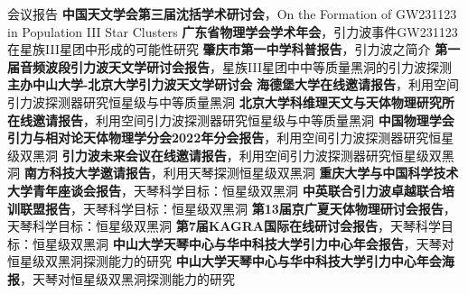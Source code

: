 
\begin{rubric}{会议报告}
	\entry*[2026] \textbf{中国天文学会第三届沈括学术研讨会}，On the Formation of GW231123 in Population III Star Clusters
	\entry*[2025] \textbf{广东省物理学会学术年会}，引力波事件GW231123在星族III星团中形成的可能性研究
	\entry*[2024] \textbf{肇庆市第一中学科普报告}，引力波之简介
	\entry*[2024] \textbf{第一届音频波段引力波天文学研讨会报告}，星族III星团中中等质量黑洞的引力波探测
	\entry*[2023] \textbf{主办中山大学-北京大学引力波天文学研讨会}
	\entry*[2023] \textbf{海德堡大学在线邀请报告}，利用空间引力波探测器研究恒星级与中等质量黑洞
	\entry*[2023] \textbf{北京大学科维理天文与天体物理研究所在线邀请报告}，利用空间引力波探测器研究恒星级与中等质量黑洞
	\entry*[2022] \textbf{中国物理学会引力与相对论天体物理学分会2022年分会报告}，利用空间引力波探测器研究恒星级双黑洞
	\entry*[2022] \textbf{引力波未来会议在线邀请报告}，利用空间引力波探测器研究恒星级双黑洞
	\entry*[2022] \textbf{南方科技大学邀请报告}，利用天琴探测恒星级双黑洞
	\entry*[2021] \textbf{重庆大学与中国科学技术大学青年座谈会报告}，天琴科学目标：恒星级双黑洞
	\entry*[2021] \textbf{中英联合引力波卓越联合培训联盟报告}，天琴科学目标：恒星级双黑洞
	\entry*[2020] \textbf{第13届京广夏天体物理研讨会报告}，天琴科学目标：恒星级双黑洞
	\entry*[2020] \textbf{第7届KAGRA国际在线研讨会报告}，天琴科学目标：恒星级双黑洞
	\entry*[2019] \textbf{中山大学天琴中心与华中科技大学引力中心年会报告}，天琴对恒星级双黑洞探测能力的研究
	\entry*[2018] \textbf{中山大学天琴中心与华中科技大学引力中心年会海报}，天琴对恒星级双黑洞探测能力的研究
\end{rubric}
